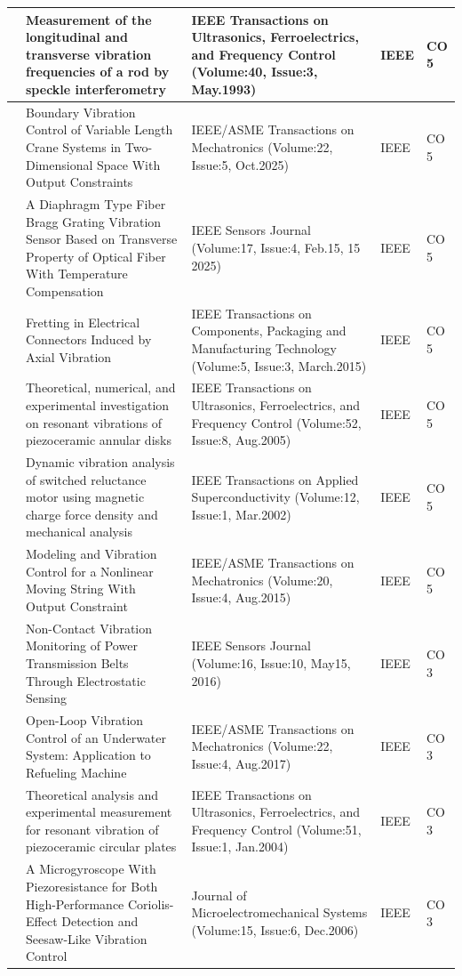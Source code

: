 \documentclass[11pt,paper=a4,answers]{exam}
\begin{document}
\begin{flushleft}
\begin{longtable}{|>{\centering\arraybackslash}p{1.4cm}  |  >{\raggedright\arraybackslash}p{6cm} |>{\centering\arraybackslash}p{3.75cm}|>{\centering\arraybackslash}p{2cm} |>{\centering\arraybackslash}p{2cm} |}
99&Measurement of the longitudinal and transverse vibration frequencies of a rod by speckle interferometry&IEEE Transactions on Ultrasonics, Ferroelectrics, and Frequency Control (Volume:40, Issue:3, May.1993)&IEEE&CO 5\\\hline
100&Boundary Vibration Control of Variable Length Crane Systems in Two-Dimensional Space With Output Constraints&IEEE/ASME Transactions on Mechatronics (Volume:22, Issue:5, Oct.2025)&IEEE&CO 5\\\hline
101&A Diaphragm Type Fiber Bragg Grating Vibration Sensor Based on Transverse Property of Optical Fiber With Temperature Compensation&IEEE Sensors Journal (Volume:17, Issue:4, Feb.15, 15 2025)&IEEE&CO 5\\\hline
102&Fretting in Electrical Connectors Induced by Axial Vibration&IEEE Transactions on Components, Packaging and Manufacturing Technology (Volume:5, Issue:3, March.2015)&IEEE&CO 5\\\hline
103&Theoretical, numerical, and experimental investigation on resonant vibrations of piezoceramic annular disks&IEEE Transactions on Ultrasonics, Ferroelectrics, and Frequency Control (Volume:52, Issue:8, Aug.2005)&IEEE&CO 5\\\hline
104&Dynamic vibration analysis of switched reluctance motor using magnetic charge force density and mechanical analysis&IEEE Transactions on Applied Superconductivity (Volume:12, Issue:1, Mar.2002)&IEEE&CO 5\\\hline
105&Modeling and Vibration Control for a Nonlinear Moving String With Output Constraint&IEEE/ASME Transactions on Mechatronics (Volume:20, Issue:4, Aug.2015)&IEEE&CO 5\\\hline
106&Non-Contact Vibration Monitoring of Power Transmission Belts Through Electrostatic Sensing&IEEE Sensors Journal (Volume:16, Issue:10, May15, 2016)&IEEE&CO 3\\\hline
107&Open-Loop Vibration Control of an Underwater System: Application to Refueling Machine&IEEE/ASME Transactions on Mechatronics (Volume:22, Issue:4, Aug.2017)&IEEE&CO 3\\\hline
108&Theoretical analysis and experimental measurement for resonant vibration of piezoceramic circular plates&IEEE Transactions on Ultrasonics, Ferroelectrics, and Frequency Control (Volume:51, Issue:1, Jan.2004)&IEEE&CO 3\\\hline
109&A Microgyroscope With Piezoresistance for Both High-Performance Coriolis-Effect Detection and Seesaw-Like Vibration Control&Journal of Microelectromechanical Systems (Volume:15, Issue:6, Dec.2006)&IEEE&CO 3\\\hline

\end{longtable}
\end{flushleft}
\end{document}
